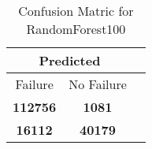 \begin{table}[] 
\caption{Confusion Matric for RandomForest100} 
\label{Table: Prediction Accuracy-DMDRandomForest100OnlySunEKF-combinationReflectionEKF-top2perfectNoFailurePrediction-Reflection} 
\centering 
\begin{tabular} 
 {@{}ccc@{}} 
\toprule 
\multicolumn{2}{c}{\textbf{Predicted}}
 \\ \midrule 
\multicolumn{1}{|c|}{Failure} & 
\multicolumn{1}{c|}{No Failure}
 \\ \midrule 
\multicolumn{1}{|c|}{\color{green}\textbf{112756}} & 
\multicolumn{1}{c|}{\color{red}\textbf{1081}}
 \\ \midrule 
\multicolumn{1}{|c|}{\color{red}\textbf{16112}} & 
\multicolumn{1}{c|}{\color{green}\textbf{40179}}
 \\ \bottomrule 
\end{tabular} 
\end{table} 
